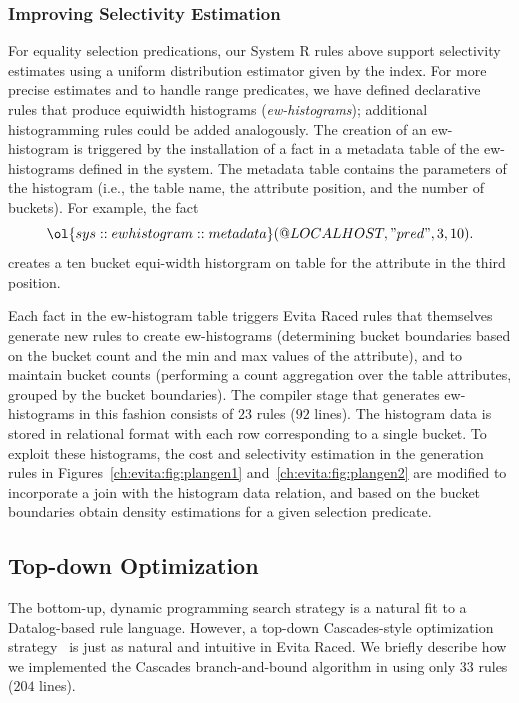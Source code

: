 \subsubsection{Improving Selectivity Estimation}

For equality selection predications, our System R rules above support selectivity
estimates using a uniform distribution estimator given by the index. For more precise
estimates and to handle range predicates, we have defined declarative rules that produce
equiwidth histograms ({\em ew-histograms}); additional histogramming rules could be
added analogously. The creation of an ew-histogram is triggered by the installation of a
fact in a metadata table of the ew-histograms defined in the system. The metadata table 
contains the parameters of the histogram (i.e., the table name, the attribute position,
and the number of buckets). For example, the fact
\[
\ol{sys::ewhistogram::metadata}(@LOCALHOST, "pred", 3, 10).
\]
creates a ten bucket equi-width historgram on table  for the attribute in the
third position.

Each fact in the ew-histogram table triggers Evita Raced rules that themselves generate
new rules to create ew-histograms (determining bucket boundaries based on the bucket
count and the min and max values of the attribute), and to maintain bucket counts (performing
a count aggregation over the table attributes, grouped by the bucket boundaries). The compiler
stage that generates ew-histograms in this fashion consists of $23$ rules ($92$ lines). The 
histogram data is stored in relational format with each row corresponding to a single bucket.
To exploit these histograms, the cost and selectivity estimation in the  generation rules
in Figures~\ref{ch:evita:fig:plangen1} and~\ref{ch:evita:fig:plangen2} are modified to incorporate
a join with the histogram data relation, and based on the bucket boundaries obtain density 
estimations for a given selection predicate.

\subsection{Top-down Optimization}

The bottom-up, dynamic programming search strategy is a natural fit to a Datalog-based rule 
language. However, a top-down Cascades-style optimization strategy~\cite{cascades} is just
as natural and intuitive in Evita Raced. We briefly describe how we implemented the Cascades 
branch-and-bound algorithm in \OVERLOG using only $33$ rules ($204$ lines).

